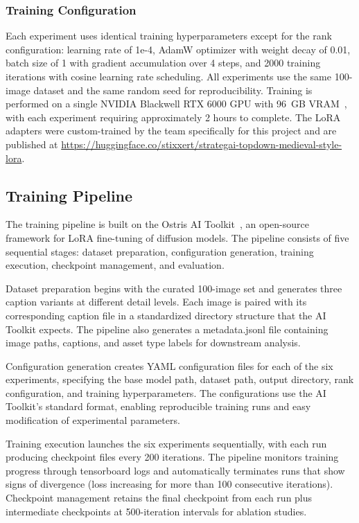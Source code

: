 \documentclass[conference]{IEEEtran}
\begin{document}
\subsubsection{Training Configuration}

Each experiment uses identical training hyperparameters except for the rank configuration: learning rate of 1e-4, AdamW optimizer with weight decay of 0.01, batch size of 1 with gradient accumulation over 4 steps, and 2000 training iterations with cosine learning rate scheduling. All experiments use the same 100-image dataset and the same random seed for reproducibility. Training is performed on a single NVIDIA Blackwell RTX 6000 GPU with 96~GB VRAM~\cite{nvidia2024blackwell}, with each experiment requiring approximately 2 hours to complete. The LoRA adapters were custom-trained by the team specifically for this project and are published at \url{https://huggingface.co/stixxert/strategai-topdown-medieval-style-lora}.

\subsection{Training Pipeline}

The training pipeline is built on the Ostris AI Toolkit~\cite{ostris2024toolkit}, an open-source framework for LoRA fine-tuning of diffusion models. The pipeline consists of five sequential stages: dataset preparation, configuration generation, training execution, checkpoint management, and evaluation.

Dataset preparation begins with the curated 100-image set and generates three caption variants at different detail levels. Each image is paired with its corresponding caption file in a standardized directory structure that the AI Toolkit expects. The pipeline also generates a metadata.jsonl file containing image paths, captions, and asset type labels for downstream analysis.

Configuration generation creates YAML configuration files for each of the six experiments, specifying the base model path, dataset path, output directory, rank configuration, and training hyperparameters. The configurations use the AI Toolkit's standard format, enabling reproducible training runs and easy modification of experimental parameters.

Training execution launches the six experiments sequentially, with each run producing checkpoint files every 200 iterations. The pipeline monitors training progress through tensorboard logs and automatically terminates runs that show signs of divergence (loss increasing for more than 100 consecutive iterations). Checkpoint management retains the final checkpoint from each run plus intermediate checkpoints at 500-iteration intervals for ablation studies.
\end{document}
